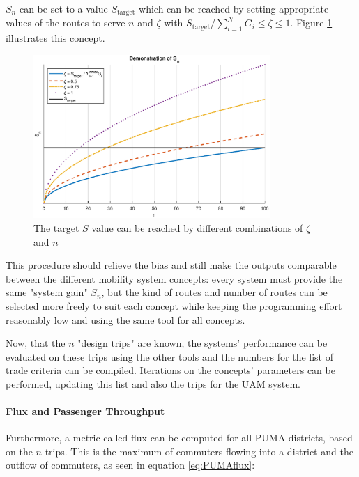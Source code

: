 $S_n$ can be set to a value $S_{\text{target}}$ which can be reached by setting appropriate values of the routes to serve $n$ and $\zeta$ with $S_{\text{target}} / \sum_{i=1}^{N}{G_i}\leq \zeta \leq 1$. Figure \ref{fig:zeta_n_demo} illustrates this concept. 

\begin{figure}
    \centering
    \includegraphics[width=0.8\textwidth]{Figures/S_nDemo.eps}
    \captionsetup{justification=centering}
    \caption{The target $S$ value can be reached by different combinations of $\zeta$ and $n$}
    \label{fig:zeta_n_demo}
\end{figure}


This procedure should relieve the bias and still make the outputs comparable between the different mobility system concepts: every system must provide the same "system gain" $S_n$, but the kind of routes and number of routes can be selected more freely to suit each concept while keeping the programming effort reasonably low and using the same tool for all concepts.

Now, that the $n$ "design trips" are known, the systems' performance can be evaluated on these trips using the other tools and the numbers for the list of trade criteria can be compiled. Iterations on the concepts' parameters can be performed, updating this list and also the trips for the UAM system.


\paragraph{Flux and Passenger Throughput}

 Furthermore, a metric called flux can be computed for all PUMA districts, based on the $n$ trips. This is the maximum of commuters flowing into a district and the outflow of commuters, as seen in equation \ref{eq:PUMAflux}:

